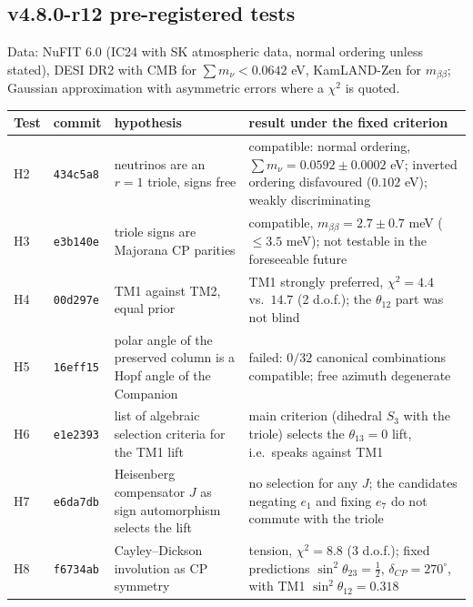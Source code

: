 \subsection*{v4.8.0-r12 pre-registered tests}
\label{subsec:v480-r12-tests}

Data: NuFIT 6.0 (IC24 with SK atmospheric data, normal ordering unless stated), DESI DR2 with CMB for
\(\sum m_\nu<0.0642\) eV, KamLAND-Zen for \(m_{\beta\beta}\); Gaussian approximation with asymmetric
errors where a \(\chi^2\) is quoted.
\begin{center}
\small
\begin{tabular}{>{\raggedright\arraybackslash}p{}>{\raggedright\arraybackslash}p{}>{\raggedright\arraybackslash}p{}>{\raggedright\arraybackslash}p{}}
\toprule
Test & commit & hypothesis & result under the fixed criterion\\
\midrule
H2 & \texttt{434c5a8} & neutrinos are an \(r=1\) triole, signs free & compatible: normal ordering, \(\sum m_\nu=0.0592\pm0.0002\) eV; inverted ordering disfavoured (\(0.102\) eV); weakly discriminating\\
H3 & \texttt{e3b140e} & triole signs are Majorana CP parities & compatible, \(m_{\beta\beta}=2.7\pm0.7\) meV (\(\le3.5\) meV); not testable in the foreseeable future\\
H4 & \texttt{00d297e} & TM1 against TM2, equal prior & TM1 strongly preferred, \(\chi^2=4.4\) vs.\ \(14.7\) (2 d.o.f.); the \(\theta_{12}\) part was not blind\\
H5 & \texttt{16eff15} & polar angle of the preserved column is a Hopf angle of the Companion & failed: \(0/32\) canonical combinations compatible; free azimuth degenerate\\
H6 & \texttt{e1e2393} & list of algebraic selection criteria for the TM1 lift & main criterion (dihedral \(S_3\) with the triole) selects the \(\theta_{13}=0\) lift, i.e.\ speaks against TM1\\
H7 & \texttt{e6da7db} & Heisenberg compensator \(J\) as sign automorphism selects the lift & no selection for any \(J\); the candidates negating \(e_1\) and fixing \(e_7\) do not commute with the triole\\
H8 & \texttt{f6734ab} & Cayley--Dickson involution as CP symmetry & tension, \(\chi^2=8.8\) (3 d.o.f.); fixed predictions \(\sin^2\theta_{23}=\tfrac12\), \(\delta_{CP}=270^\circ\), with TM1 \(\sin^2\theta_{12}=0.318\)\\
\bottomrule
\end{tabular}
\end{center}

